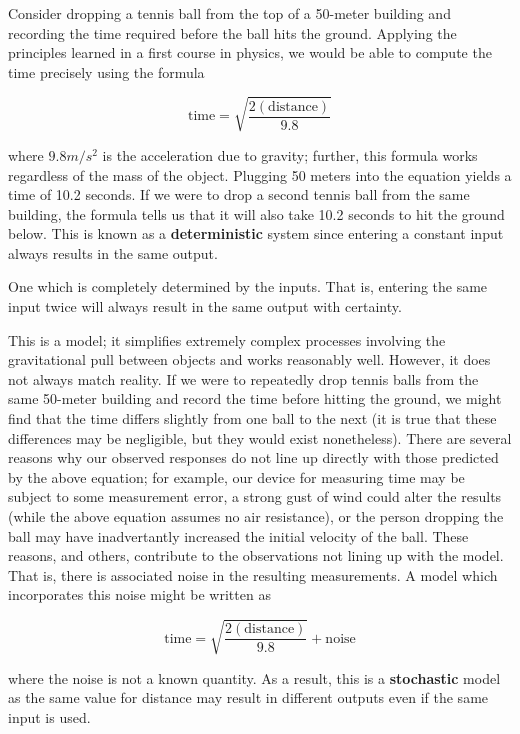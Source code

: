 \documentclass[]{book}
\theoremstyle{plain}
\theoremstyle{mydefn}
\theoremstyle{myexmpl}
\theoremstyle{remark}
\let\BeginKnitrBlock\begin \let\EndKnitrBlock\end
\let\BeginKnitrBlock\begin \let\EndKnitrBlock\end
\begin{document}
Consider dropping a tennis ball from the top of a 50-meter building and
recording the time required before the ball hits the ground. Applying
the principles learned in a first course in physics, we would be able to
compute the time precisely using the formula

\[\text{time} = \sqrt{\frac{2(\text{distance})}{9.8}}\]

where \(9.8 m/s^2\) is the acceleration due to gravity; further, this
formula works regardless of the mass of the object. Plugging 50 meters
into the equation yields a time of 10.2 seconds. If we were to drop a
second tennis ball from the same building, the formula tells us that it
will also take 10.2 seconds to hit the ground below. This is known as a
\textbf{deterministic} system since entering a constant input always
results in the same output.

\BeginKnitrBlock{definition}[Deterministic Process]
\protect\hypertarget{def:defn-deterministic-process}{}{\label{def:defn-deterministic-process}
{} }One which is completely
determined by the inputs. That is, entering the same input twice will
always result in the same output with certainty.
\EndKnitrBlock{definition}

This is a model; it simplifies extremely complex processes involving the
gravitational pull between objects and works reasonably well. However,
it does not always match reality. If we were to repeatedly drop tennis
balls from the same 50-meter building and record the time before hitting
the ground, we might find that the time differs slightly from one ball
to the next (it is true that these differences may be negligible, but
they would exist nonetheless). There are several reasons why our
observed responses do not line up directly with those predicted by the
above equation; for example, our device for measuring time may be
subject to some measurement error, a strong gust of wind could alter the
results (while the above equation assumes no air resistance), or the
person dropping the ball may have inadvertantly increased the initial
velocity of the ball. These reasons, and others, contribute to the
observations not lining up with the model. That is, there is associated
noise in the resulting measurements. A model which incorporates this
noise might be written as

\[\text{time} = \sqrt{\frac{2(\text{distance})}{9.8}} + \text{noise}\]

where the noise is not a known quantity. As a result, this is a
\textbf{stochastic} model as the same value for distance may result in
different outputs even if the same input is used.
\end{document}
